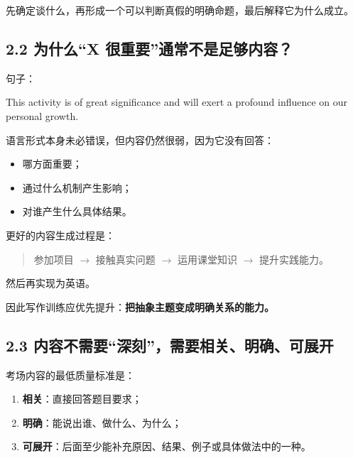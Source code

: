\documentclass[11pt,a4paper]{ctexart}
\newcommand{\kw}[1]{\textbf{#1}}
\begin{document}
\begin{corebox}[内容生成的核心原则]
\begin{center}
\end{center}
先确定谈什么，再形成一个可以判断真假的明确命题，最后解释它为什么成立。
\end{corebox}

\subsection{2.2 为什么“X 很重要”通常不是足够内容？}
句子：
\begin{eng}
This activity is of great significance and will exert a profound influence on our personal growth.
\end{eng}
语言形式本身未必错误，但内容仍然很弱，因为它没有回答：
\begin{itemize}
  \item 哪方面重要；
  \item 通过什么机制产生影响；
  \item 对谁产生什么具体结果。
\end{itemize}

更好的内容生成过程是：
\begin{quote}
参加项目 $\rightarrow$ 接触真实问题 $\rightarrow$ 运用课堂知识 $\rightarrow$ 提升实践能力。
\end{quote}
然后再实现为英语。

因此写作训练应优先提升：\kw{把抽象主题变成明确关系的能力。}

\subsection{2.3 内容不需要“深刻”，需要相关、明确、可展开}
考场内容的最低质量标准是：
\begin{enumerate}
  \item \kw{相关}：直接回答题目要求；
  \item \kw{明确}：能说出谁、做什么、为什么；
  \item \kw{可展开}：后面至少能补充原因、结果、例子或具体做法中的一种。
\end{enumerate}
\end{document}
